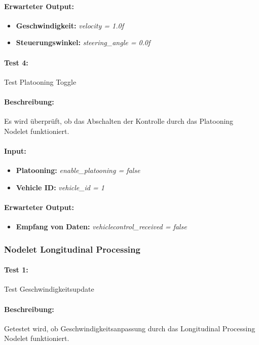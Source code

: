 \documentclass[a4paper, 12pt, titlepage]{scrartcl}
\begin{document}
				\paragraph{Erwarteter Output:}
				\begin{itemize} \itemsep-0.5em
					\item \textbf{Geschwindigkeit:} \emph{velocity = 1.0f}
					\item \textbf{Steuerungswinkel:} \emph{steering\_angle = 0.0f}
				\end{itemize}

				\paragraph{Test 4:} {Test Platooning Toggle}
				\paragraph{Beschreibung:} Es wird überprüft, ob das Abschalten der Kontrolle durch das Platooning Nodelet funktioniert.
				\paragraph{Input:}
				\begin{itemize} \itemsep-0.5em
					\item \textbf{Platooning:} \emph{enable\_platooning = false}
					\item \textbf{Vehicle ID:} \emph{vehicle\_id = 1}
				\end{itemize}
				\paragraph{Erwarteter Output:}
				\begin{itemize} \itemsep-0.5em
					\item \textbf{Empfang von Daten:} \emph{vehiclecontrol\_received = false}
				\end{itemize}

			\subsubsection{Nodelet Longitudinal Processing}
			\label{node_longitudinal_processing}
			\paragraph{Test 1:}{Test Geschwindigkeitsupdate}
			\paragraph{Beschreibung:} Getestet wird, ob Geschwindigkeitsanpassung durch das Longitudinal Processing Nodelet funktioniert.
\end{document}
